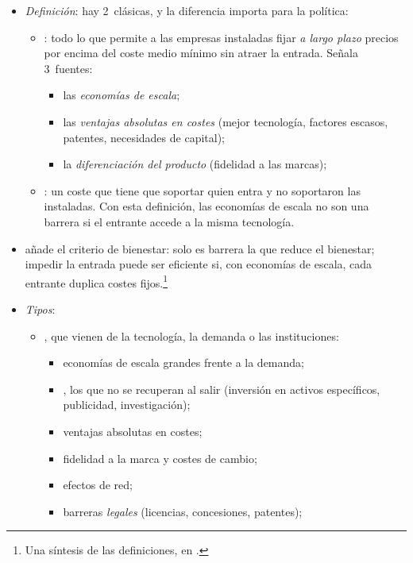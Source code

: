 \documentclass[11pt]{article}
\begin{document}
\begin{itemize}
\item \emph{Definición}: hay 2~clásicas, y la diferencia importa para la política:
  \begin{itemize}
  \item \textcite{Bain1956Barriers}: todo lo que permite a las empresas instaladas fijar \emph{a largo plazo} precios por encima del coste medio mínimo sin atraer la entrada. Señala 3~fuentes:
    \begin{itemize}
    \item las \emph{economías de escala};
    \item las \emph{ventajas absolutas en costes} (mejor tecnología, factores escasos, patentes, necesidades de capital);
    \item la \emph{diferenciación del producto} (fidelidad a las marcas);
    \end{itemize}
  \item \textcite{Stigler1968Organization}: un coste que tiene que soportar quien entra y no soportaron las instaladas. Con esta definición, las economías de escala no son una barrera si el entrante accede a la misma tecnología.
  \end{itemize}
\item \textcite{Weizsacker1980Welfare} añade el criterio de bienestar: solo es barrera la que reduce el bienestar; impedir la entrada puede ser eficiente si, con economías de escala, cada entrante duplica costes fijos.\footnote{Una síntesis de las definiciones, en \textcite{McAfeeMialonWilliams2004What}.}
\item \emph{Tipos}:
  \begin{itemize}
  \item {}, que vienen de la tecnología, la demanda o las instituciones:
    \begin{itemize}
    \item economías de escala grandes frente a la demanda;
    \item {}, los que no se recuperan al salir (inversión en activos específicos, publicidad, investigación);
    \item ventajas absolutas en costes;
    \item fidelidad a la marca y costes de cambio;
    \item efectos de red;
    \item barreras \emph{legales} (licencias, concesiones, patentes);
    \end{itemize}

\end{itemize}
\end{itemize}
\end{document}
